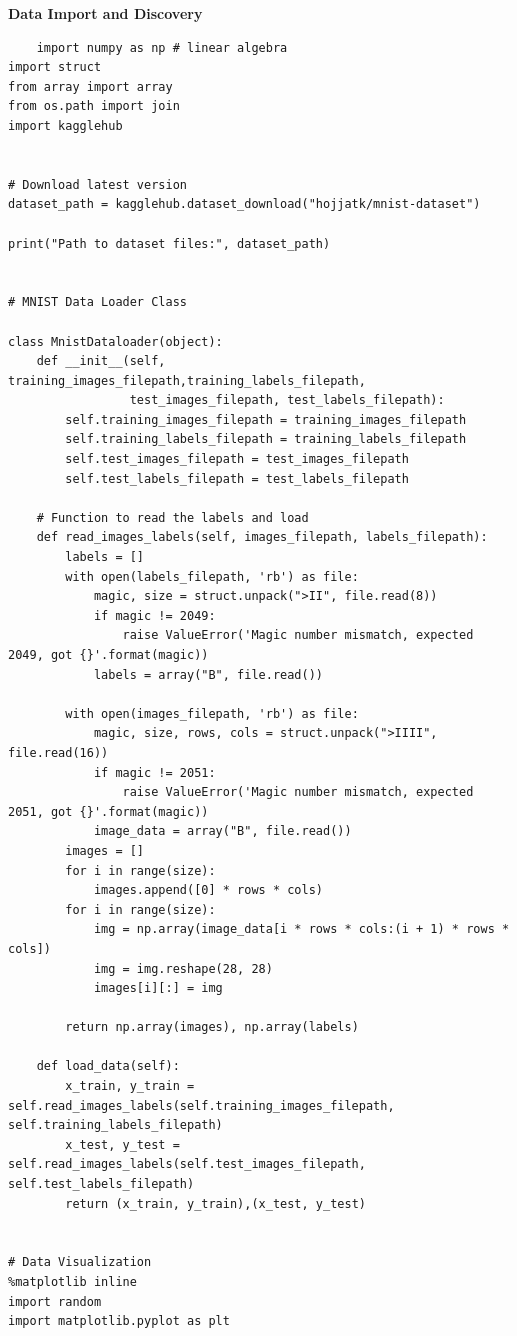 \documentclass[a4paper]{article}
\begin{document}
\textbf{Data Import and Discovery}
\begin{lstlisting}
    import numpy as np # linear algebra
import struct
from array import array
from os.path import join
import kagglehub


# Download latest version
dataset_path = kagglehub.dataset_download("hojjatk/mnist-dataset")

print("Path to dataset files:", dataset_path)


# MNIST Data Loader Class

class MnistDataloader(object):
    def __init__(self, training_images_filepath,training_labels_filepath,
                 test_images_filepath, test_labels_filepath):
        self.training_images_filepath = training_images_filepath
        self.training_labels_filepath = training_labels_filepath
        self.test_images_filepath = test_images_filepath
        self.test_labels_filepath = test_labels_filepath
    
    # Function to read the labels and load
    def read_images_labels(self, images_filepath, labels_filepath):        
        labels = []
        with open(labels_filepath, 'rb') as file:
            magic, size = struct.unpack(">II", file.read(8))
            if magic != 2049:
                raise ValueError('Magic number mismatch, expected 2049, got {}'.format(magic))
            labels = array("B", file.read())        
        
        with open(images_filepath, 'rb') as file:
            magic, size, rows, cols = struct.unpack(">IIII", file.read(16))
            if magic != 2051:
                raise ValueError('Magic number mismatch, expected 2051, got {}'.format(magic))
            image_data = array("B", file.read())        
        images = []
        for i in range(size):
            images.append([0] * rows * cols)
        for i in range(size):
            img = np.array(image_data[i * rows * cols:(i + 1) * rows * cols])
            img = img.reshape(28, 28)
            images[i][:] = img            
        
        return np.array(images), np.array(labels)
            
    def load_data(self):
        x_train, y_train = self.read_images_labels(self.training_images_filepath, self.training_labels_filepath)
        x_test, y_test = self.read_images_labels(self.test_images_filepath, self.test_labels_filepath)
        return (x_train, y_train),(x_test, y_test)
        
        
# Data Visualization
%matplotlib inline
import random
import matplotlib.pyplot as plt


\end{lstlisting}
\end{document}
